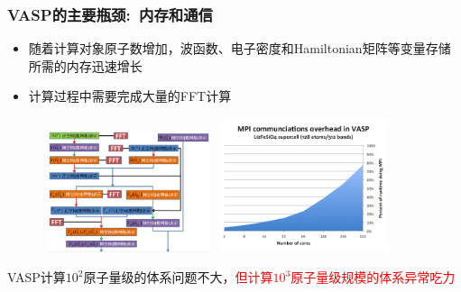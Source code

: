 \frame
{
	\frametitle{\textrm{VASP}的主要瓶颈:~内存和通信}
\begin{itemize}
	\item 随着计算对象原子数增加，波函数、电子密度和\textrm{Hamiltonian}矩阵等变量存储所需的内存迅速增长
	\item 计算过程中需要完成大量的\textrm{FFT}计算\\
		{\fontsize{7.2pt}{5.2pt}}
\end{itemize}
\begin{figure}[h!]
	\vspace{-0.20in}
\centering
\includegraphics[height=1.39in,width=1.98in,viewport=0 0 800 600,clip]{Figures/dual_grid-2.png}
\includegraphics[height=1.55in,width=1.95in,viewport=0 0 240 200,clip]{Figures/VASP-mpi-Li128.png}
\label{ABINIT_vs_VASP-3}
\end{figure} 
\textrm{VASP}计算$10^2$原子量级的体系问题不大，\textcolor{red}{但计算$10^3$原子量级规模的体系异常吃力}

}

